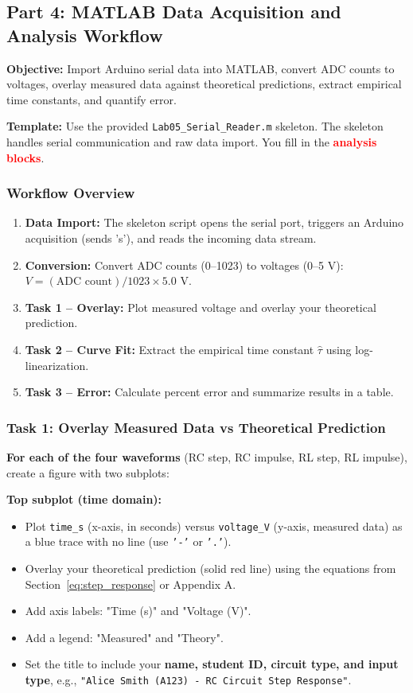 \documentclass[11pt,letterpaper]{article}
\begin{document}
\subsection{Part 4: MATLAB Data Acquisition and Analysis Workflow}

\textbf{Objective:} Import Arduino serial data into MATLAB, convert ADC counts to voltages, overlay measured data against theoretical predictions, extract empirical time constants, and quantify error.

\textbf{Template:} Use the provided \texttt{Lab05\_Serial\_Reader.m} skeleton. The skeleton handles serial communication and raw data import. You fill in the \textcolor{red}{\textbf{analysis blocks}}.

\subsubsection*{Workflow Overview}

\begin{enumerate}
    \item \textbf{Data Import:} The skeleton script opens the serial port, triggers an Arduino acquisition (sends 's'), and reads the incoming data stream.
    \item \textbf{Conversion:} Convert ADC counts (0--1023) to voltages (0--5 V): $V = (\text{ADC count}) / 1023 \times 5.0$ V.
    \item \textbf{Task 1 -- Overlay:} Plot measured voltage and overlay your theoretical prediction.
    \item \textbf{Task 2 -- Curve Fit:} Extract the empirical time constant $\hat{\tau}$ using log-linearization.
    \item \textbf{Task 3 -- Error:} Calculate percent error and summarize results in a table.
\end{enumerate}

\subsubsection*{Task 1: Overlay Measured Data vs Theoretical Prediction}

\textbf{For each of the four waveforms} (RC step, RC impulse, RL step, RL impulse), create a figure with two subplots:

\noindent
\textbf{Top subplot (time domain):}
\begin{itemize}
    \item Plot \texttt{time\_s} (x-axis, in seconds) versus \texttt{voltage\_V} (y-axis, measured data) as a blue trace with no line (use \texttt{'-'} or \texttt{'.'}).
    \item Overlay your theoretical prediction (solid red line) using the equations from Section~\ref{eq:step_response} or Appendix A.
    \item Add axis labels: "Time (s)" and "Voltage (V)".
    \item Add a legend: "Measured" and "Theory".
    \item Set the title to include your \textbf{name, student ID, circuit type, and input type}, e.g., \texttt{"Alice Smith (A123) - RC Circuit Step Response"}.
\end{itemize}
\end{document}

